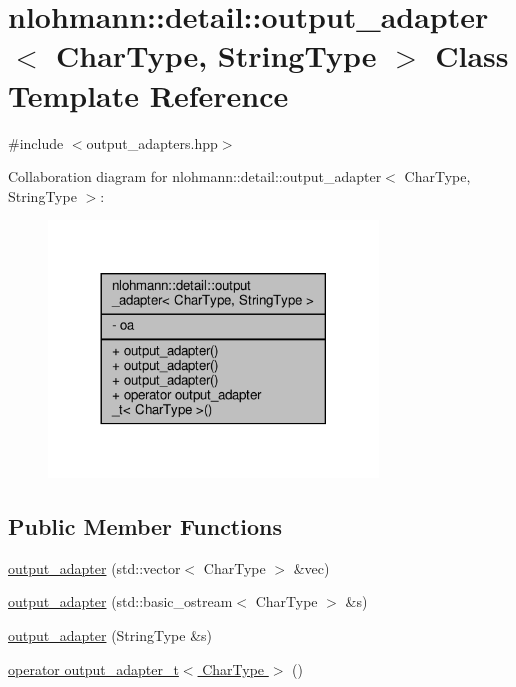 \hypertarget{classnlohmann_1_1detail_1_1output__adapter}{}\section{nlohmann\+:\+:detail\+:\+:output\+\_\+adapter$<$ Char\+Type, String\+Type $>$ Class Template Reference}
\label{classnlohmann_1_1detail_1_1output__adapter}


{\ttfamily \#include $<$output\+\_\+adapters.\+hpp$>$}



Collaboration diagram for nlohmann\+:\+:detail\+:\+:output\+\_\+adapter$<$ Char\+Type, String\+Type $>$\+:\nopagebreak
\begin{figure}[H]
\begin{center}
\leavevmode
\includegraphics[width=248pt]{classnlohmann_1_1detail_1_1output__adapter__coll__graph}
\end{center}
\end{figure}
\subsection*{Public Member Functions}
\begin{DoxyCompactItemize}
\item 
\hyperlink{classnlohmann_1_1detail_1_1output__adapter_a05a30a77b568fd84676078d938cbd484}{output\+\_\+adapter} (std\+::vector$<$ Char\+Type $>$ \&vec)
\item 
\hyperlink{classnlohmann_1_1detail_1_1output__adapter_a43b3ba852e6a2c3f4d312543bb04c00d}{output\+\_\+adapter} (std\+::basic\+\_\+ostream$<$ Char\+Type $>$ \&s)
\item 
\hyperlink{classnlohmann_1_1detail_1_1output__adapter_a6ad59d1ec534383b430cd7ef8a518539}{output\+\_\+adapter} (String\+Type \&s)
\item 
\hyperlink{classnlohmann_1_1detail_1_1output__adapter_a5fdac7aec8ade2f4bb0b5df30550d90c}{operator output\+\_\+adapter\+\_\+t$<$ Char\+Type $>$} ()
\end{DoxyCompactItemize}
